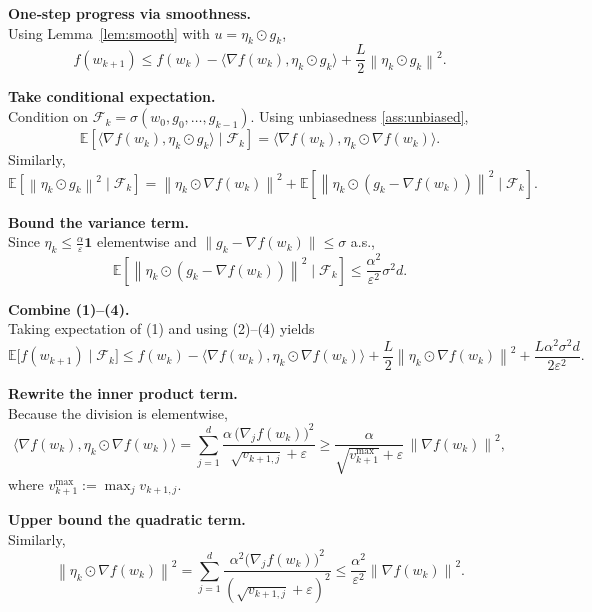 \documentclass{article}
\newcommand{\E}{\mathbb{E}}
\newcommand{\norm}[1]{\left\|#1\right\|}
\newcommand{\grad}{\nabla}
\begin{document}
\begin{enumerate}[label={[\textbf{Step \arabic*.}]}, leftmargin=*]
\item \textbf{One‑step progress via smoothness.}\\
Using Lemma~\ref{lem:smooth} with $u=\eta_{k}\odot g_{k}$,
\[
f(w_{k+1})\le f(w_{k})-\langle\grad f(w_{k}),\eta_{k}\odot g_{k}\rangle
+\frac{L}{2}\norm{\eta_{k}\odot g_{k}}^{2}. \tag{1}
\]

\item \textbf{Take conditional expectation.}\\
Condition on $\mathcal{F}_{k}=\sigma(w_{0},g_{0},\dots,g_{k-1})$. Using unbiasedness \eqref{ass:unbiased},
\[
\E\!\left[\langle\grad f(w_{k}),\eta_{k}\odot g_{k}\rangle\mid\mathcal{F}_{k}\right]
= \big\langle\grad f(w_{k}),\eta_{k}\odot\grad f(w_{k})\big\rangle.
\tag{2}
\]
Similarly,
\[
\E\!\left[\norm{\eta_{k}\odot g_{k}}^{2}\mid\mathcal{F}_{k}\right]
= \norm{\eta_{k}\odot\grad f(w_{k})}^{2}
+\E\!\left[\norm{\eta_{k}\odot (g_{k}-\grad f(w_{k}))}^{2}\mid\mathcal{F}_{k}\right].
\tag{3}
\]

\item \textbf{Bound the variance term.}\\
Since $\eta_{k}\le \frac{\alpha}{\varepsilon}\mathbf{1}$ elementwise and $\|g_{k}-\grad f(w_{k})\|\le\sigma$ a.s.,
\[
\E\!\left[\norm{\eta_{k}\odot (g_{k}-\grad f(w_{k}))}^{2}\mid\mathcal{F}_{k}\right]
\le \frac{\alpha^{2}}{\varepsilon^{2}}\sigma^{2}d. \tag{4}
\]

\item \textbf{Combine (1)–(4).}\\
Taking expectation of (1) and using (2)–(4) yields
\[
\E\!\big[f(w_{k+1})\mid\mathcal{F}_{k}\big]
\le f(w_{k})-\big\langle\grad f(w_{k}),\eta_{k}\odot\grad f(w_{k})\big\rangle
+\frac{L}{2}\norm{\eta_{k}\odot\grad f(w_{k})}^{2}
+\frac{L\alpha^{2}\sigma^{2}d}{2\varepsilon^{2}}.
\tag{5}
\]

\item \textbf{Rewrite the inner product term.}\\
Because the division is elementwise,
\[
\big\langle\grad f(w_{k}),\eta_{k}\odot\grad f(w_{k})\big\rangle
= \sum_{j=1}^{d}\frac{\alpha\,\big(\grad_{j}f(w_{k})\big)^{2}}{\sqrt{v_{k+1,j}}+\varepsilon}
\ge
\frac{\alpha}{\sqrt{v_{k+1}^{\max}}+\varepsilon}\,\norm{\grad f(w_{k})}^{2},
\tag{6}
\]
where $v_{k+1}^{\max}:=\max_{j}v_{k+1,j}$.

\item \textbf{Upper bound the quadratic term.}\\
Similarly,
\[
\norm{\eta_{k}\odot\grad f(w_{k})}^{2}
= \sum_{j=1}^{d}\frac{\alpha^{2}\big(\grad_{j}f(w_{k})\big)^{2}}{(\sqrt{v_{k+1,j}}+\varepsilon)^{2}}
\le \frac{\alpha^{2}}{\varepsilon^{2}}\norm{\grad f(w_{k})}^{2}. \tag{7}
\]


\end{enumerate}
\end{document}
